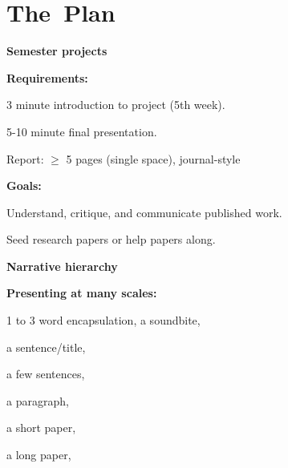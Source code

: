 










\section{The\ Plan}


  \textbf{Semester projects}

  \textbf{Requirements:}
    
     
      3 minute introduction to project (5th week).
     
      5-10 minute final presentation.
    
      Report: $\ge$ 5 pages (single space), journal-style
    
  

  \textbf{Goals:}
    
     
      Understand, critique, and communicate published work.
     
      Seed research papers or help papers along.
    
  



  \textbf{Narrative hierarchy}

  \textbf{Presenting at many scales:}
    
     
      1 to 3 word encapsulation, a soundbite,
     
      a sentence/title,
     
      a few sentences,
     
      a paragraph,
     
      a short paper,
     
      a long paper,
     
